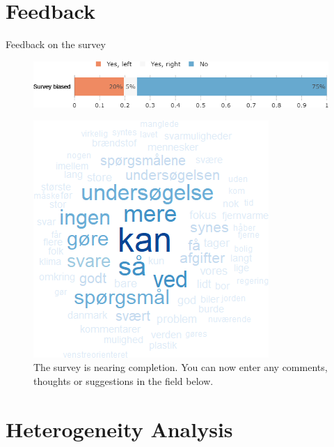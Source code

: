 \documentclass[aspectratio=169,9pt,dvipsnames]{beamer}
\begin{document}
\section{Feedback}
\begin{frame}{Feedback on the survey}%
\vspace{-.2cm}
\begin{figure}[h!]
\caption{Do you feel that this survey was politically biased?}
\includegraphics[width=.6\textwidth]{../figures/DK/survey_biased_DK.png} \\
\vspace{.5cm}
\caption{The survey is nearing completion. You can now enter any comments, thoughts or suggestions in the field below.}
\includegraphics[width=.3\textwidth]{../figures/DK/comment_field_DK.png}
\end{figure}
\end{frame}

\section{Heterogeneity Analysis}
\end{document}
